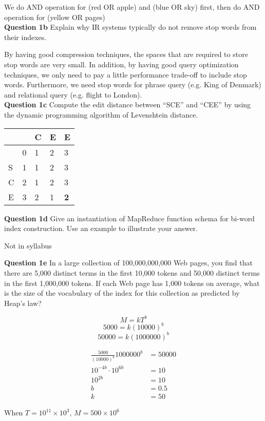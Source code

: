 \documentclass[11pt,a4paper]{report}
\begin{document}
\begin{multicols*}{2}
\noindent We do AND operation for (red OR apple) and (blue OR sky) first, then do AND operation for (yellow OR pages)\\

\noindent \textbf{Question 1b} Explain why IR systems typically do not remove stop words from their indexes. 

\noindent By having good compression techniques, the spaces that are required to store stop words are very small. In addition, by having good query optimization techniques, we only need to pay a little performance trade-off to include stop words. Furthermore, we need stop words for phrase query (e.g. King of Denmark) and relational query (e.g. flight to London). \\

\noindent \textbf{Question 1c} Compute the edit distance between ``SCE'' and ``CEE'' by using the dynamic programming algorithm of Levenshtein distance. 

\begin{center}
\begin{tabular}{ | l | l  l  l  l  |} 
    \hline
      &   & C & E & E \\
    \hline
      & 0 & 1 & 2 & 3 \\
    S & 1 & 1 & 2 & 3 \\
    C & 2 & 1 & 2 & 3 \\
    E & 3 & 2 & 1 & \textbf{2} \\
    \hline
\end{tabular}
\end{center}

\noindent \textbf{Question 1d} Give an instantiation of MapReduce function schema for bi-word index construction. Use an example to illustrate your answer.

\noindent Not in syllabus

\noindent \textbf{Question 1e} In a large collection of 100,000,000,000 Web pages, you find that there are 5,000 distinct terms in the first 10,000 tokens and 50,000 distinct terms in the first 1,000,000 tokens. If each Web page has 1,000 tokens on average, what is the size of the vocabulary of the index for this collection as predicted by Heap's law?

$$M=kT^b$$
$$5000=k(10000)^b$$
$$50000=k(1000000)^b$$

\begin{equation*}
\begin{split}
    \frac{5000}{(10000)^b}1000000^b &= 50000 \\
    10^{-4b}\cdot 10^{6b} &= 10 \\
    10^{2b} &= 10\\
    b &= 0.5\\
    k &= 50
\end{split}
\end{equation*}

\noindent When $T=10^{11} \times 10^3$, $M=500 \times 10^6$

\end{multicols*}
\end{document}

